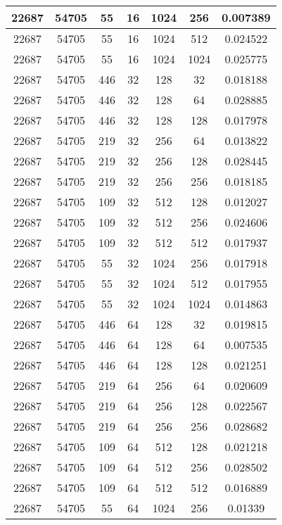 \documentclass[9pt]{article}
\begin{document}
\begin{tabular}{|c|c|c|c|c|c|c| }
\hline
22687  & 54705  & 55  & 16  & 1024  & 256  & 0.007389 \\
\hline
22687  & 54705  & 55  & 16  & 1024  & 512  & 0.024522 \\
\hline
22687  & 54705  & 55  & 16  & 1024  & 1024  & 0.025775 \\
\hline
22687  & 54705  & 446  & 32  & 128  & 32  & 0.018188 \\
\hline
22687  & 54705  & 446  & 32  & 128  & 64  & 0.028885 \\
\hline
22687  & 54705  & 446  & 32  & 128  & 128  & 0.017978 \\
\hline
22687  & 54705  & 219  & 32  & 256  & 64  & 0.013822 \\
\hline
22687  & 54705  & 219  & 32  & 256  & 128  & 0.028445 \\
\hline
22687  & 54705  & 219  & 32  & 256  & 256  & 0.018185 \\
\hline
22687  & 54705  & 109  & 32  & 512  & 128  & 0.012027 \\
\hline
22687  & 54705  & 109  & 32  & 512  & 256  & 0.024606 \\
\hline
22687  & 54705  & 109  & 32  & 512  & 512  & 0.017937 \\
\hline
22687  & 54705  & 55  & 32  & 1024  & 256  & 0.017918 \\
\hline
22687  & 54705  & 55  & 32  & 1024  & 512  & 0.017955 \\
\hline
22687  & 54705  & 55  & 32  & 1024  & 1024  & 0.014863 \\
\hline
22687  & 54705  & 446  & 64  & 128  & 32  & 0.019815 \\
\hline
22687  & 54705  & 446  & 64  & 128  & 64  & 0.007535 \\
\hline
22687  & 54705  & 446  & 64  & 128  & 128  & 0.021251 \\
\hline
22687  & 54705  & 219  & 64  & 256  & 64  & 0.020609 \\
\hline
22687  & 54705  & 219  & 64  & 256  & 128  & 0.022567 \\
\hline
22687  & 54705  & 219  & 64  & 256  & 256  & 0.028682 \\
\hline
22687  & 54705  & 109  & 64  & 512  & 128  & 0.021218 \\
\hline
22687  & 54705  & 109  & 64  & 512  & 256  & 0.028502 \\
\hline
22687  & 54705  & 109  & 64  & 512  & 512  & 0.016889 \\
\hline
22687  & 54705  & 55  & 64  & 1024  & 256  & 0.01339 \\
\hline

\end{tabular}
\end{document}
